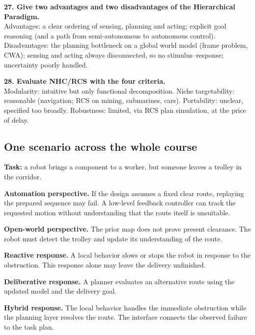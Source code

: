 \begin{samepage}\textbf{27. Give two advantages and two disadvantages of the Hierarchical Paradigm.}\\
Advantages: a clear ordering of sensing, planning and acting; explicit goal reasoning (and a path from semi-autonomous to autonomous control). Disadvantages: the planning bottleneck on a global world model (frame problem, CWA); sensing and acting always disconnected, so no stimulus--response; uncertainty poorly handled.\par\end{samepage}

\begin{samepage}\textbf{28. Evaluate NHC/RCS with the four criteria.}\\
Modularity: intuitive but only functional decomposition. Niche targetability: reasonable (navigation; RCS on mining, submarines, cars). Portability: unclear, specified too broadly. Robustness: limited, via RCS plan simulation, at the price of delay.\par\end{samepage}

\subsection{One scenario across the whole course}
\textbf{Task:} a robot brings a component to a worker, but someone leaves a trolley in the corridor.

\textbf{Automation perspective.} If the design assumes a fixed clear route, replaying the prepared sequence may fail. A low-level feedback controller can track the requested motion without understanding that the route itself is unsuitable.

\textbf{Open-world perspective.} The prior map does not prove present clearance. The robot must detect the trolley and update its understanding of the route.

\textbf{Reactive response.} A local behavior slows or stops the robot in response to the obstruction. This response alone may leave the delivery unfinished.

\textbf{Deliberative response.} A planner evaluates an alternative route using the updated model and the delivery goal.

\textbf{Hybrid response.} The local behavior handles the immediate obstruction while the planning layer resolves the route. The interface connects the observed failure to the task plan.

